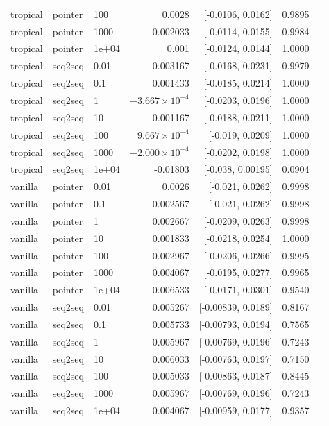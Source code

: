 \documentclass[10pt]{article}
\begin{document}
{\begin{longtable}{lllrrrl}
tropical & pointer & 100 & 0.0028 & [-0.0106, 0.0162] & 0.9895 & \\
tropical & pointer & 1000 & 0.002033 & [-0.0114, 0.0155] & 0.9984 & \\
tropical & pointer & 1e+04 & 0.001 & [-0.0124, 0.0144] & 1.0000 & \\
tropical & seq2seq & 0.01 & 0.003167 & [-0.0168, 0.0231] & 0.9979 & \\
tropical & seq2seq & 0.1 & 0.001433 & [-0.0185, 0.0214] & 1.0000 & \\
tropical & seq2seq & 1 & $-3.667\times10^{-4}$ & [-0.0203, 0.0196] & 1.0000 & \\
tropical & seq2seq & 10 & 0.001167 & [-0.0188, 0.0211] & 1.0000 & \\
tropical & seq2seq & 100 & $9.667\times10^{-4}$ & [-0.019, 0.0209] & 1.0000 & \\
tropical & seq2seq & 1000 & $-2.000\times10^{-4}$ & [-0.0202, 0.0198] & 1.0000 & \\
tropical & seq2seq & 1e+04 & -0.01803 & [-0.038, 0.00195] & 0.0904 & \\
vanilla & pointer & 0.01 & 0.0026 & [-0.021, 0.0262] & 0.9998 & \\
vanilla & pointer & 0.1 & 0.002567 & [-0.021, 0.0262] & 0.9998 & \\
vanilla & pointer & 1 & 0.002667 & [-0.0209, 0.0263] & 0.9998 & \\
vanilla & pointer & 10 & 0.001833 & [-0.0218, 0.0254] & 1.0000 & \\
vanilla & pointer & 100 & 0.002967 & [-0.0206, 0.0266] & 0.9995 & \\
vanilla & pointer & 1000 & 0.004067 & [-0.0195, 0.0277] & 0.9965 & \\
vanilla & pointer & 1e+04 & 0.006533 & [-0.0171, 0.0301] & 0.9540 & \\
vanilla & seq2seq & 0.01 & 0.005267 & [-0.00839, 0.0189] & 0.8167 & \\
vanilla & seq2seq & 0.1 & 0.005733 & [-0.00793, 0.0194] & 0.7565 & \\
vanilla & seq2seq & 1 & 0.005967 & [-0.00769, 0.0196] & 0.7243 & \\
vanilla & seq2seq & 10 & 0.006033 & [-0.00763, 0.0197] & 0.7150 & \\
vanilla & seq2seq & 100 & 0.005033 & [-0.00863, 0.0187] & 0.8445 & \\
vanilla & seq2seq & 1000 & 0.005967 & [-0.00769, 0.0196] & 0.7243 & \\
vanilla & seq2seq & 1e+04 & 0.004067 & [-0.00959, 0.0177] & 0.9357 & \\
\bottomrule
\end{longtable}
}
\end{document}
